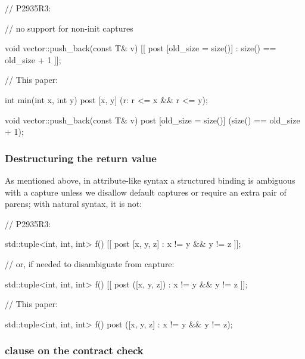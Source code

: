 \begin{minipage}[t]{8cm}
\begin{codeblock}
// P2935R3:

// no support for non-init captures


void vector::push_back(const T& v)
  [[ post [old_size = size()]
    : size() == old_size + 1 ]];
    
\end{codeblock}
\end{minipage}
\begin{minipage}[t]{8cm}
\begin{codeblock}
// This paper:
    
int min(int x, int y)
  post [x, y] (r: r <= x && r <= y);
  
void vector::push_back(const T& v)
  post [old_size = size()] 
    (size() == old_size + 1);
\end{codeblock}
\end{minipage}


\subsubsection{Destructuring the return value}
\label{subsubsec:struct}

As mentioned above, in attribute-like syntax a structured binding is ambiguous with a capture unless we disallow default captures or require an extra pair of parens; with natural syntax, it is not:

\begin{minipage}[t]{8cm}
\begin{codeblock}
// P2935R3:

std::tuple<int, int, int> f()
  [[ post [x, y, z] : x != y && y != z ]];
  
// or, if needed to disambiguate from capture:

std::tuple<int, int, int> f()
  [[ post ([x, y, z]) : x != y && y != z ]];
\end{codeblock}
\end{minipage}
\begin{minipage}[t]{8cm}
\begin{codeblock}
// This paper:

std::tuple<int, int, int> f()
  post ([x, y, z] : x != y && y != z);
\end{codeblock}
\end{minipage}

\subsubsection{ clause on the contract check}

